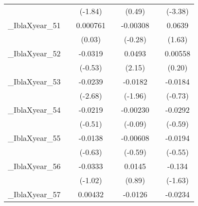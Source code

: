 {\begin{tabular}{l*{6}{c}}
            &                     &     (-1.84)         &                     &      (0.49)         &                     &     (-3.38)         \\
[1em]
\_IblaXyear\_51&                     &    0.000761         &                     &    -0.00308         &                     &      0.0639         \\
            &                     &      (0.03)         &                     &     (-0.28)         &                     &      (1.63)         \\
[1em]
\_IblaXyear\_52&                     &     -0.0319         &                     &      0.0493\sym{*}  &                     &     0.00558         \\
            &                     &     (-0.53)         &                     &      (2.15)         &                     &      (0.20)         \\
[1em]
\_IblaXyear\_53&                     &     -0.0239\sym{*}  &                     &     -0.0182         &                     &     -0.0184         \\
            &                     &     (-2.68)         &                     &     (-1.96)         &                     &     (-0.73)         \\
[1em]
\_IblaXyear\_54&                     &     -0.0219         &                     &    -0.00230         &                     &     -0.0292         \\
            &                     &     (-0.51)         &                     &     (-0.09)         &                     &     (-0.59)         \\
[1em]
\_IblaXyear\_55&                     &     -0.0138         &                     &    -0.00608         &                     &     -0.0194         \\
            &                     &     (-0.63)         &                     &     (-0.59)         &                     &     (-0.55)         \\
[1em]
\_IblaXyear\_56&                     &     -0.0333         &                     &      0.0145         &                     &      -0.134         \\
            &                     &     (-1.02)         &                     &      (0.89)         &                     &     (-1.63)         \\
[1em]
\_IblaXyear\_57&                     &     0.00432         &                     &     -0.0126         &                     &     -0.0234         \\

\end{tabular}}
